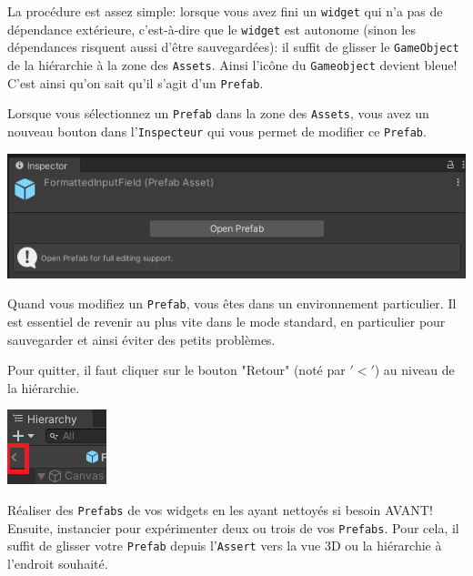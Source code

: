 \documentclass[a4paper,10pt]{article}
\newenvironment{info}%
{\begin{tcolorbox}[breakable,colback=green!5!white,colframe=green!75!black,title=Information]}%
{\end{tcolorbox}}
\newenvironment{attention}%
{\begin{tcolorbox}[breakable,colback=green!25!white,colframe=red!55!black,title=Attention]}%
{\end{tcolorbox}}
\begin{document}
La procédure est assez simple: lorsque vous avez fini un \texttt{widget} qui n'a pas de dépendance extérieure, c'est-à-dire que le \texttt{widget} est autonome (sinon les dépendances risquent aussi d'être sauvegardées): il suffit de glisser le \texttt{GameObject} de la hiérarchie à la zone des \texttt{Assets}. Ainsi l'icône du \texttt{Gameobject} devient bleue! C'est ainsi qu'on sait qu'il s'agit d'un \texttt{Prefab}.


\begin{info}
Lorsque vous sélectionnez un \texttt{Prefab} dans la zone des \texttt{Assets}, vous avez un nouveau bouton dans l'\texttt{Inspecteur} qui vous permet de modifier ce \texttt{Prefab}.
\begin{center}
	\includegraphics[width=0.5\linewidth]{rc/unity_set_ui_open_prefab}
\end{center}
\end{info}

\begin{attention}
Quand vous modifiez un \texttt{Prefab}, vous êtes dans un environnement particulier. Il est essentiel de revenir au plus vite dans le mode standard, en particulier pour sauvegarder et ainsi éviter des petits problèmes. 

Pour quitter, il faut cliquer sur le bouton "Retour" (noté par $'<'$) au niveau de la hiérarchie.
\begin{center}
	\includegraphics[width=0.3\linewidth]{rc/unity_set_ui_close_prefab}
\end{center}
\end{attention}

Réaliser des \texttt{Prefabs} de vos widgets en les ayant nettoyés si besoin AVANT! Ensuite, instancier pour expérimenter deux ou trois de vos \texttt{Prefabs}. Pour cela, il suffit de glisser votre \texttt{Prefab} depuis l'\texttt{Assert} vers la vue 3D ou la hiérarchie à l'endroit souhaité.
\end{document}
